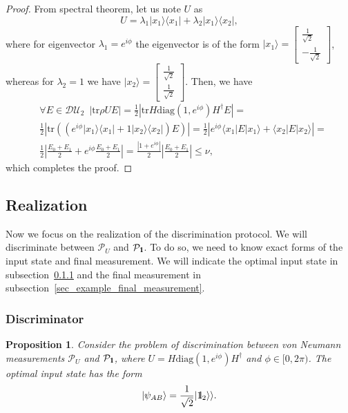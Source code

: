 \documentclass[preprint,12pt, a4paper]{elsarticle}
\newcommand{\ket}[1]{\ensuremath{|#1\rangle}}
\newcommand{\bra}[1]{\ensuremath{\langle#1|}}
\newcommand{\ketbra}[2]{\ensuremath{\ket{#1}\bra{#2}}}
\newcommand{\proj}[1]{\ensuremath{\ketbra{#1}{#1}}}
\newcommand{\1}{{\rm 1\hspace{-0.9mm}l}}
\newcommand{\Id}{{\rm 1\hspace{-0.9mm}l}}
\newcommand{\PP}{\mathcal{P}}
\newcommand{\diaguni}{\ensuremath{\mathcal{DU}}}
\newcommand{\diag}{\mathrm{diag}}
\newcommand{\tr}{\mathrm{tr}}
\newtheorem{proposition}{Proposition}
\begin{document}
\begin{proof}
	From spectral theorem, let us note $U$ as
	\begin{equation}
	U= \lambda_1 \ketbra{x_1}{x_1} + \lambda_2 \ketbra{x_1}{x_2}, 
	\end{equation}
	where  for eigenvector $\lambda_1 = e^{i \phi}$ the eigenvector is 
	of the form $\ket{x_1} = 
	\left[\begin{array}{c}\frac{1}{\sqrt{2}}\\-\frac{1}{\sqrt{2}}\end{array}\right]$,
	 whereas for  $\lambda_2 = 1$ we have $\ket{x_2} = 
	\left[\begin{array}{c}\frac{1}{\sqrt{2}}\\\frac{1}{\sqrt{2}}\end{array}\right]$.
	Then, we have 
\begin{equation}
\begin{split}
& \forall E \in \diaguni_2 \,\,\, | \tr \rho U E | = \frac{1}{2}  \left| \tr 
H \diag(1, e^{i\phi}) H^\dagger E \right| =  \\ &
\frac{1}{2} \left| \tr\left((  e^{i \phi} \proj{x_1} + 1 \proj{x_2} ) E \right) 
\right|  = 
\frac{1}{2} \left| e^{i \phi}  \bra{x_1} E \ket{x_1} + \bra{x_2} E \ket{x_2} 
\right| = \\& 
\frac{1}{2} \left| \frac{E_0 + E_1}{2} + e^{i \phi } \frac{E_0+E_1}{2} \right| 
= 
\frac{\left| 1+ e^{i \phi } \right|}{2} \left| \frac{E_0 + E_1}{2} \right| \le 
\nu, 
	\end{split}
\end{equation}
	which completes the proof.
\end{proof}


\subsection{Realization}\label{sec:example_realization}
Now we focus on the realization of the discrimination protocol. We will 
discriminate between $\PP_U$ and $\PP_\1$. To do so, we need to know exact 
forms of the input state and final measurement. We will indicate the optimal 
input state in subsection~\ref{sec:example_discriminator} and the final 
measurement in subsection~\ref{sec_example_final_measurement}.


\subsubsection{Discriminator}\label{sec:example_discriminator}

\begin{proposition}
Consider the problem of discrimination between von Neumann measurements $\PP_U$ 
and $\PP_\1$, where $U = H\diag(1, e^{i \phi}) H^\dagger $ and $\phi \in [0, 
2\pi)$.  The optimal input state has the form
\begin{equation}
\ket{\psi_{AB}} = \frac{1}{\sqrt{2}} |\Id_2 \rangle \rangle.
\end{equation}
\end{proposition}
\end{document}
